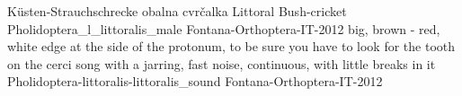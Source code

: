 {Küsten-Strauchschrecke} %
{obalna cvr\v{c}alka} %
{Littoral Bush-cricket} %
{Pholidoptera_l_littoralis_male} {Fontana-Orthoptera-IT-2012} %
{} {} %
{big, brown - red, white edge at the side of the protonum, to be sure you have to look for the tooth on the cerci} %
{song with a jarring, fast noise, continuous, with little breaks in it} %
{Pholidoptera-littoralis-littoralis_sound} {Fontana-Orthoptera-IT-2012} %

